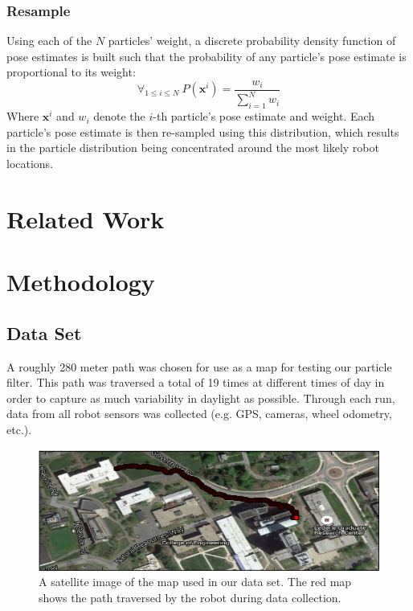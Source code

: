 \documentclass[letterpaper, 12 pt, conference]{ieeeconf}  %
\begin{document}
\subsubsection{Resample} 
Using each of the $N$ particles' weight, a discrete probability density function of pose estimates is built such that the probability of any particle's pose estimate is proportional to its weight: 
$$
\forall _{1\leq i \leq N}~P(\textbf{x}^i)=\frac{w_i}{\sum _{i=1} ^N w_i}
$$
Where $\textbf{x}^i$ and $w_i$ denote the $i$-th particle's pose estimate and weight. Each particle's pose estimate is then re-sampled using this distribution, which results in the particle distribution being concentrated around the most likely robot locations.  

\section{Related Work}

\section{Methodology}

\subsection{Data Set}
A roughly 280 meter path was chosen for use as a map for testing our particle filter. This path was traversed a total of 19 times at different times of day in order to capture as much variability in daylight as possible. Through each run, data from all robot sensors was collected (e.g. GPS, cameras, wheel odometry, etc.).  

\begin{figure}[h]
\centering
\includegraphics[scale=0.5]{map}
\caption{A satellite image of the map used in our data set. The red map shows the path traversed by the robot during data collection.}
\end{figure}
\end{document}
